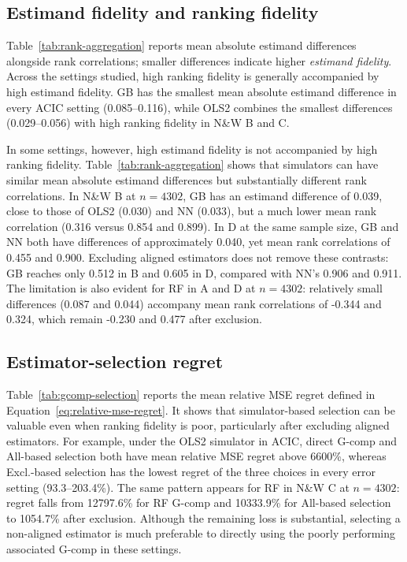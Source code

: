 \subsection{Estimand fidelity and ranking fidelity}

Table~\ref{tab:rank-aggregation} reports mean absolute estimand differences alongside rank correlations; smaller differences indicate higher \emph{estimand fidelity}. Across the settings studied, high ranking fidelity is generally accompanied by high estimand fidelity. GB has the smallest mean absolute estimand difference in every ACIC setting (0.085--0.116), while OLS2 combines the smallest differences (0.029--0.056) with high ranking fidelity in N\&W B and C.

In some settings, however, high estimand fidelity is not accompanied by high ranking fidelity. Table~\ref{tab:rank-aggregation} shows that simulators can have similar mean absolute estimand differences but substantially different rank correlations. In N\&W B at \(n=4302\), GB has an estimand difference of 0.039, close to those of OLS2 (0.030) and NN (0.033), but a much lower mean rank correlation (0.316 versus 0.854 and 0.899). In D at the same sample size, GB and NN both have differences of approximately 0.040, yet mean rank correlations of 0.455 and 0.900. Excluding aligned estimators does not remove these contrasts: GB reaches only 0.512 in B and 0.605 in D, compared with NN's 0.906 and 0.911. The limitation is also evident for RF in A and D at \(n=4302\): relatively small differences (0.087 and 0.044) accompany mean rank correlations of -0.344 and 0.324, which remain -0.230 and 0.477 after exclusion.

\subsection{Estimator-selection regret}


Table~\ref{tab:gcomp-selection} reports the mean relative MSE regret defined in Equation~\eqref{eq:relative-mse-regret}. It shows that simulator-based selection can be valuable even when ranking fidelity is poor, particularly after excluding aligned estimators. For example, under the OLS2 simulator in ACIC, direct G-comp and All-based selection both have mean relative MSE regret above 6600\%, whereas Excl.-based selection has the lowest regret of the three choices in every error setting (93.3--203.4\%). The same pattern appears for RF in N\&W C at \(n=4302\): regret falls from 12797.6\% for RF G-comp and 10333.9\% for All-based selection to 1054.7\% after exclusion. Although the remaining loss is substantial, selecting a non-aligned estimator is much preferable to directly using the poorly performing associated G-comp in these settings.

